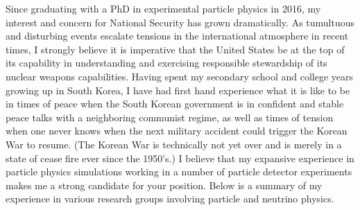 \documentclass[10pt]{article} %
\begin{document}
%
%




Since graduating with a PhD in experimental particle physics in 2016, my
interest and concern for National Security has grown dramatically. As
tumultuous and disturbing events escalate tensions in the international
atmosphere in recent times, I strongly believe it is imperative that the United
States be at the top of its capability in understanding and exercising
responsible stewardship of its nuclear weapons capabilities. Having spent my
secondary school and college years growing up in South Korea, I have had first
hand experience what it is like to be in times of peace when the South Korean
government is in confident and stable peace talks with a neighboring communist
regime, as well as times of tension when one never knows when the next military
accident could trigger the Korean War to resume. (The Korean War is technically
not yet over and is merely in a state of cease fire ever since the 1950's.) I
believe that my expansive experience in particle physics simulations working in
a number of particle detector experiments makes me a strong candidate for your
position. Below is a summary of my experience in various research groups
involving particle and neutrino physics.
\end{document}

